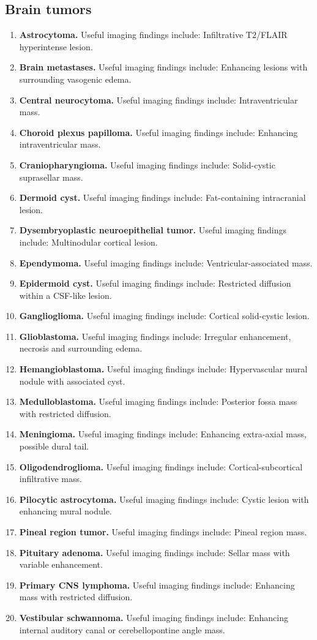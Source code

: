 \subsection{Brain tumors}
\begin{enumerate}[leftmargin=*,itemsep=0.45em,topsep=0.4em]
\item \textbf{Astrocytoma.} Useful imaging findings include: Infiltrative T2/FLAIR hyperintense lesion.
\item \textbf{Brain metastases.} Useful imaging findings include: Enhancing lesions with surrounding vasogenic edema.
\item \textbf{Central neurocytoma.} Useful imaging findings include: Intraventricular mass.
\item \textbf{Choroid plexus papilloma.} Useful imaging findings include: Enhancing intraventricular mass.
\item \textbf{Craniopharyngioma.} Useful imaging findings include: Solid-cystic suprasellar mass.
\item \textbf{Dermoid cyst.} Useful imaging findings include: Fat-containing intracranial lesion.
\item \textbf{Dysembryoplastic neuroepithelial tumor.} Useful imaging findings include: Multinodular cortical lesion.
\item \textbf{Ependymoma.} Useful imaging findings include: Ventricular-associated mass.
\item \textbf{Epidermoid cyst.} Useful imaging findings include: Restricted diffusion within a CSF-like lesion.
\item \textbf{Ganglioglioma.} Useful imaging findings include: Cortical solid-cystic lesion.
\item \textbf{Glioblastoma.} Useful imaging findings include: Irregular enhancement, necrosis and surrounding edema.
\item \textbf{Hemangioblastoma.} Useful imaging findings include: Hypervascular mural nodule with associated cyst.
\item \textbf{Medulloblastoma.} Useful imaging findings include: Posterior fossa mass with restricted diffusion.
\item \textbf{Meningioma.} Useful imaging findings include: Enhancing extra-axial mass, possible dural tail.
\item \textbf{Oligodendroglioma.} Useful imaging findings include: Cortical-subcortical infiltrative mass.
\item \textbf{Pilocytic astrocytoma.} Useful imaging findings include: Cystic lesion with enhancing mural nodule.
\item \textbf{Pineal region tumor.} Useful imaging findings include: Pineal region mass.
\item \textbf{Pituitary adenoma.} Useful imaging findings include: Sellar mass with variable enhancement.
\item \textbf{Primary CNS lymphoma.} Useful imaging findings include: Enhancing mass with restricted diffusion.
\item \textbf{Vestibular schwannoma.} Useful imaging findings include: Enhancing internal auditory canal or cerebellopontine angle mass.
\end{enumerate}

